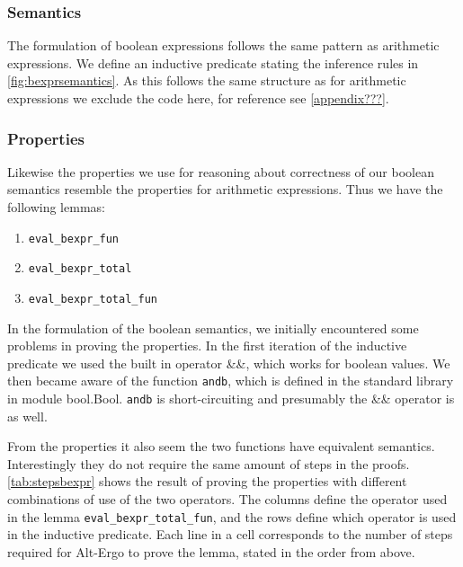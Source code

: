 \subsubsection{Semantics}
The formulation of boolean expressions follows the same pattern as arithmetic expressions.
We define an inductive predicate stating the inference rules in \autoref{fig:bexprsemantics}.
As this follows the same structure as for arithmetic expressions we exclude the code here,
for reference see \autoref{appendix???}.

\subsubsection{Properties}
Likewise the properties we use for reasoning about correctness of our boolean semantics resemble the properties for arithmetic expressions. Thus we have the following lemmas:

\begin{enumerate}
  \item \texttt{eval\_bexpr\_fun}
  \item \texttt{eval\_bexpr\_total}
  \item \texttt{eval\_bexpr\_total\_fun}
\end{enumerate}

In the formulation of the boolean semantics, we initially encountered some problems in proving the properties.
In the first iteration of the inductive predicate we used the built in operator \&\&, which works for boolean values.
We then became aware of the function \texttt{andb}, which is defined in the standard library in module bool.Bool.
\texttt{andb} is short-circuiting and presumably the \&\& operator is as well.

From the properties it also seem the two functions have equivalent semantics.
Interestingly they do not require the same amount of steps in
the proofs. \autoref{tab:stepsbexpr} shows the result of proving the properties with different combinations of use of the two operators.
The columns define the operator used in the lemma \texttt{eval\_bexpr\_total\_fun},
and the rows define which operator is used in the inductive predicate.
Each line in a cell corresponds to the number of steps required for Alt-Ergo to prove the lemma, stated in the order from above.

